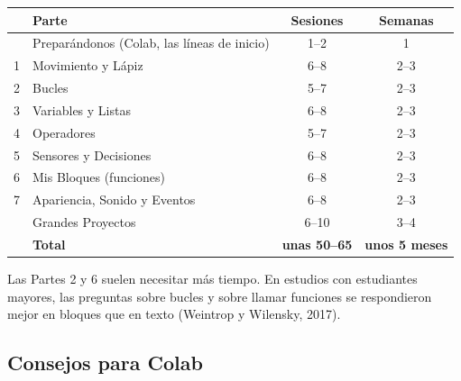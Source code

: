 \begin{center}
\renewcommand{\arraystretch}{1.1}
\begin{tabular}{l P{7.4cm} c c}
\toprule
 & \textbf{Parte} & \textbf{Sesiones} & \textbf{Semanas} \\
\midrule
 & Preparándonos (Colab, las líneas de inicio) & 1--2 & 1 \\
1 & Movimiento y Lápiz & 6--8 & 2--3 \\
2 & Bucles & 5--7 & 2--3 \\
3 & Variables y Listas & 6--8 & 2--3 \\
4 & Operadores & 5--7 & 2--3 \\
5 & Sensores y Decisiones & 6--8 & 2--3 \\
6 & Mis Bloques (funciones) & 6--8 & 2--3 \\
7 & Apariencia, Sonido y Eventos & 6--8 & 2--3 \\
 & Grandes Proyectos & 6--10 & 3--4 \\
\midrule
 & \textbf{Total} & \textbf{unas 50--65} & \textbf{unos 5 meses} \\
\bottomrule
\end{tabular}
\end{center}

Las Partes 2 y 6 suelen necesitar más tiempo. En estudios con estudiantes mayores, las preguntas sobre bucles y sobre llamar funciones se respondieron mejor en bloques que en texto (Weintrop y Wilensky, 2017).

\subsection*{Consejos para Colab}

